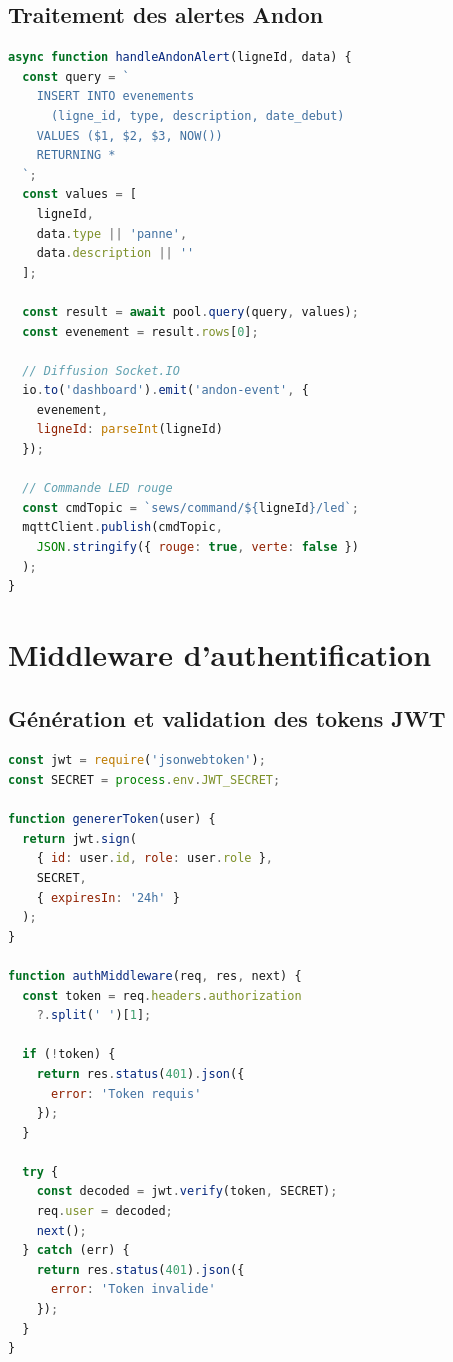 \subsection{Traitement des alertes Andon}

\begin{lstlisting}[language=JavaScript,caption={Traitement d'une alerte Andon},
label={lst:handle_alert}]
async function handleAndonAlert(ligneId, data) {
  const query = `
    INSERT INTO evenements 
      (ligne_id, type, description, date_debut)
    VALUES ($1, $2, $3, NOW())
    RETURNING *
  `;
  const values = [
    ligneId,
    data.type || 'panne',
    data.description || ''
  ];

  const result = await pool.query(query, values);
  const evenement = result.rows[0];

  // Diffusion Socket.IO
  io.to('dashboard').emit('andon-event', {
    evenement,
    ligneId: parseInt(ligneId)
  });

  // Commande LED rouge
  const cmdTopic = `sews/command/${ligneId}/led`;
  mqttClient.publish(cmdTopic, 
    JSON.stringify({ rouge: true, verte: false })
  );
}
\end{lstlisting}

\section{Middleware d'authentification}

\subsection{G\'en\'eration et validation des tokens JWT}

\begin{lstlisting}[language=JavaScript,caption={Middleware JWT},label={lst:middleware_jwt}]
const jwt = require('jsonwebtoken');
const SECRET = process.env.JWT_SECRET;

function genererToken(user) {
  return jwt.sign(
    { id: user.id, role: user.role },
    SECRET,
    { expiresIn: '24h' }
  );
}

function authMiddleware(req, res, next) {
  const token = req.headers.authorization
    ?.split(' ')[1];

  if (!token) {
    return res.status(401).json({
      error: 'Token requis'
    });
  }

  try {
    const decoded = jwt.verify(token, SECRET);
    req.user = decoded;
    next();
  } catch (err) {
    return res.status(401).json({
      error: 'Token invalide'
    });
  }
}
\end{lstlisting}

